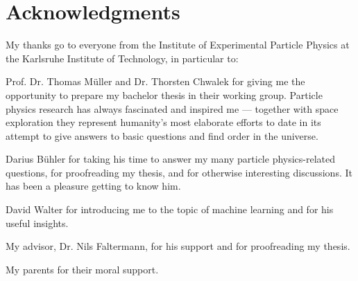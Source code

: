\chapter*{Acknowledgments}

My thanks go to everyone from the Institute of Experimental Particle Physics at the Karlsruhe Institute of Technology, in particular to:

Prof. Dr. Thomas Müller and Dr. Thorsten Chwalek for giving me the opportunity to prepare my bachelor thesis in their working group. Particle physics research has always fascinated and inspired me --- together with space exploration they represent humanity's most elaborate efforts to date in its attempt to give answers to basic questions and find order in the universe.

Darius Bühler for taking his time to answer my many particle physics-related questions, for proofreading my thesis, and for otherwise interesting discussions. It has been a pleasure getting to know him.

David Walter for introducing me to the topic of machine learning and for his useful insights.

My advisor, Dr. Nils Faltermann, for his support and for proofreading my thesis.

My parents for their moral support.